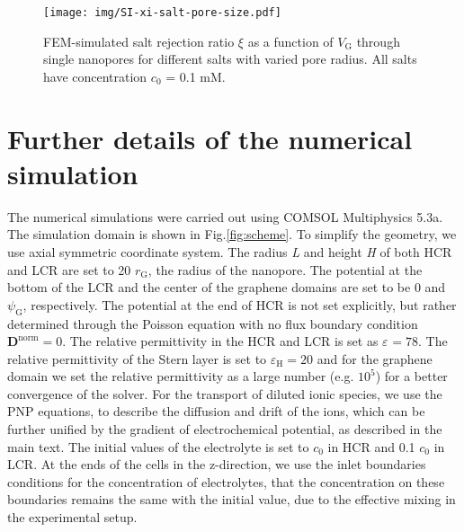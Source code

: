\documentclass[journal=langd5,email=true, hyperref=true, keywords=false]{achemso}
\newcommand{\Fig}{Fig.}
\begin{document}
\begin{figure}[htbp]
  \centering
   \texttt{[image: img/SI-xi-salt-pore-size.pdf]}
  \caption{FEM-simulated salt rejection ratio $\xi$ as a function of
    $V_{\mathrm{G}}$ through single nanopores for different salts with
    varied pore radius. All salts have concentration $c_{0}$ = 0.1 mM.}
  \label{fig:xi-salts-pore}
\end{figure}


\pagebreak
\section{Further details of the numerical simulation }
\label{sec:numer}

The numerical simulations were carried out using COMSOL Multiphysics
5.3a. The simulation domain is shown in \Fig \ref{fig:scheme}. To
simplify the geometry, we use axial symmetric coordinate system. The
radius \textit{L} and height \textit{H} of both HCR and LCR are set to
20 $r_{\mathrm{G}}$, the radius of the nanopore. The potential at the
bottom of the LCR and the center of the graphene domains are set to be
0 and $\psi_{\mathrm{G}}$, respectively. The potential at the end of
HCR is not set explicitly, but rather determined through the Poisson
equation with no flux boundary condition
$\boldsymbol{D}^{\mathrm{norm}}=0$. The relative permittivity in the
HCR and LCR is set as $\varepsilon_{\mathrm{}}=78$. The relative
permittivity of the Stern layer is set to
$\varepsilon_{\mathrm{H}}=20$\cite{Conway_1951} and for the graphene
domain we set the relative permittivity as a large number
(e.g. $10^{5}$) for a better convergence of the solver.  For the
transport of diluted ionic species, we use the PNP equations, to
describe the diffusion and drift of the ions, which can be further
unified by the gradient of electrochemical potential, as described in
the main text. The initial values of the electrolyte is set to $c_{0}$
in HCR and 0.1 $c_{0}$ in LCR. At the ends of the cells in the
z-direction, we use the inlet boundaries conditions for the
concentration of electrolytes, that the concentration on these
boundaries remains the same with the initial value, due to the
effective mixing in the experimental setup.
\end{document}
